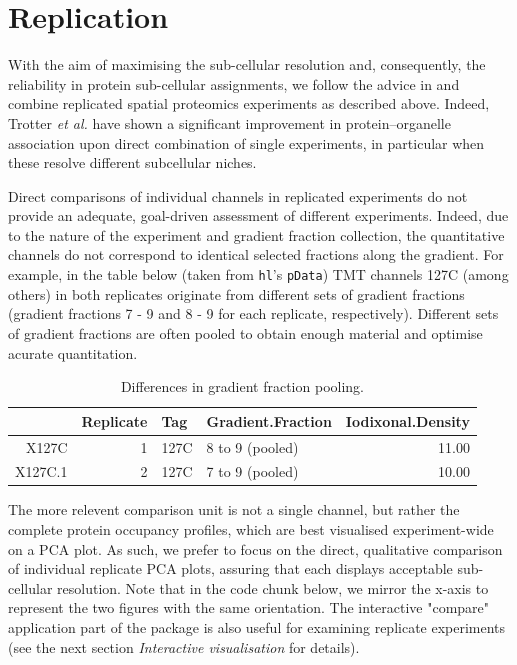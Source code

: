\pagebreak

\section*{Replication}

With the aim of maximising the sub-cellular resolution and,
consequently, the reliability in protein sub-cellular assignments, we
follow the advice in \cite{Trotter:2010} and combine replicated spatial
proteomics experiments as described above. Indeed, Trotter \textit{et
  al.} have shown a significant improvement in protein–organelle
association upon direct combination of single experiments, in
particular when these resolve different subcellular niches.

Direct comparisons of individual channels in replicated experiments
do not provide an adequate, goal-driven assessment of different
experiments. Indeed, due to the nature of the experiment and gradient
fraction collection, the quantitative channels do not correspond to
identical selected fractions along the gradient. For example, in the
table below (taken from \texttt{hl}'s \texttt{pData}) TMT channels
127C (among others) in both replicates originate from different sets
of gradient fractions (gradient fractions 7 - 9 and 8 - 9 for each
replicate, respectively). Different sets of gradient fractions are
often pooled to obtain enough material and optimise acurate
quantitation.

\begin{table}[ht]
\centering
\begin{tabular}{rrllr}
  \hline
 & Replicate & Tag & Gradient.Fraction & Iodixonal.Density \\ 
  \hline
X127C &   1 & 127C & 8 to 9 (pooled) & 11.00 \\ 
  X127C.1 &   2 & 127C & 7 to 9 (pooled) & 10.00 \\ 
   \hline
\end{tabular}
\caption{Differences in gradient fraction pooling.} 
\label{tab:pdtab}
\end{table}


\pagebreak

The more relevent comparison unit is not a single channel, but rather
the complete protein occupancy profiles, which are best visualised
experiment-wide on a PCA plot. As such, we prefer to focus on the
direct, qualitative comparison of individual replicate PCA plots,
assuring that each displays acceptable sub-cellular resolution. Note
that in the code chunk below, we mirror the x-axis to represent the
two figures with the same orientation. The interactive "compare"
application part of the  package is also useful for
examining replicate experiments (see the next section
\textit{Interactive visualisation} for details).

